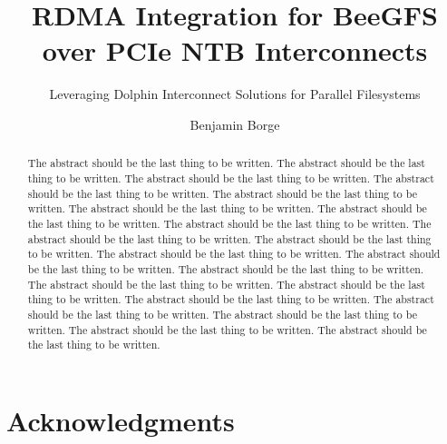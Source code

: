 \documentclass[a4paper, USenglish, 11pt]{report}
\author{Benjamin Borge}
\title{RDMA Integration for BeeGFS over PCIe NTB Interconnects}
\subtitle{Leveraging Dolphin Interconnect Solutions for Parallel Filesystems}
\begin{document}
\uiomasterfp[program={Informatics: Programming and System Architecture},color=pink, supervisors={Håkon Kvale Stensland\and Tore Heide Larsen \and Jonas Markussen}]

\begin{abstract}
The abstract should be the last thing to be written. The abstract should be the last thing to be written. The abstract should be the last thing to be written. The abstract should be the last thing to be written. The abstract should be the last thing to be written. The abstract should be the last thing to be written. The abstract should be the last thing to be written. The abstract should be the last thing to be written. The abstract should be the last thing to be written. The abstract should be the last thing to be written. The abstract should be the last thing to be written. The abstract should be the last thing to be written. The abstract should be the last thing to be written. The abstract should be the last thing to be written. The abstract should be the last thing to be written. The abstract should be the last thing to be written. The abstract should be the last thing to be written. The abstract should be the last thing to be written. The abstract should be the last thing to be written. The abstract should be the last thing to be written. 
\end{abstract}

\setcounter{page}{3}

\section*{Acknowledgments}
\newpage

\tableofcontents

\newpage
\listoffigures
\newpage
\listoftables
\newpage
\listoflistings
\newpage









\cleardoublepage
{}
{}


\appendix


\end{document}
